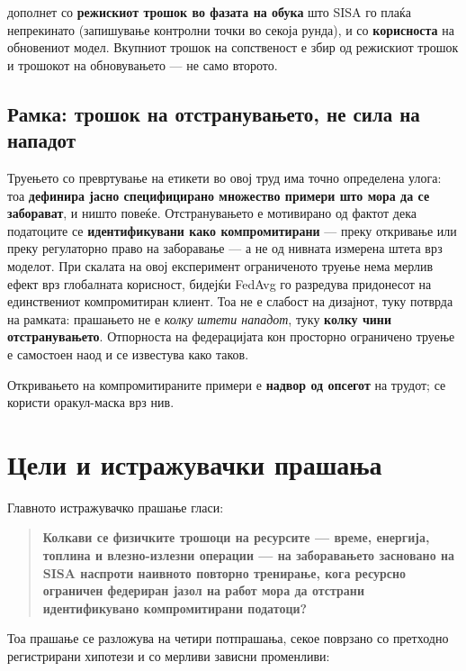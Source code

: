дополнет со \textbf{режискиот трошок во фазата на обука} што SISA го плаќа непрекинато
(запишување контролни точки во секоја рунда), и со \textbf{корисноста} на обновениот модел.
Вкупниот трошок на сопственост е збир од режискиот трошок и трошокот на обновувањето --- не
само второто.

\subsection{Рамка: трошок на отстранувањето, не сила на нападот}

Труењето со превртување на етикети во овој труд има точно определена улога: тоа
\textbf{дефинира јасно специфицирано множество примери што мора да се заборават}, и ништо
повеќе. Отстранувањето е мотивирано од фактот дека податоците се \textbf{идентификувани како
компромитирани} --- преку откривање или преку регулаторно право на заборавање
\cite{gdpr2016} --- а не од нивната измерена штета врз моделот. При скалата на овој
експеримент ограниченото труење нема мерлив ефект врз глобалната корисност, бидејќи FedAvg
го разредува придонесот на единствениот компромитиран клиент. Тоа не е слабост на
дизајнот, туку потврда на рамката: прашањето не е \emph{колку штети нападот}, туку
\textbf{колку чини отстранувањето}. Отпорноста на федерацијата кон просторно ограничено труење
е самостоен наод и се известува како таков.

Откривањето на компромитираните примери е \textbf{надвор од опсегот} на трудот; се користи
оракул-маска врз нив.

\section{Цели и истражувачки прашања}

Главното истражувачко прашање гласи:

\begin{quote}
\textbf{Колкави се физичките трошоци на ресурсите --- време, енергија, топлина и влезно-излезни
операции --- на заборавањето засновано на SISA наспроти наивното повторно тренирање, кога
ресурсно ограничен федериран јазол на работ мора да отстрани идентификувано
компромитирани податоци?}
\end{quote}

Тоа прашање се разложува на четири потпрашања, секое поврзано со претходно регистрирани
хипотези и со мерливи зависни променливи:

